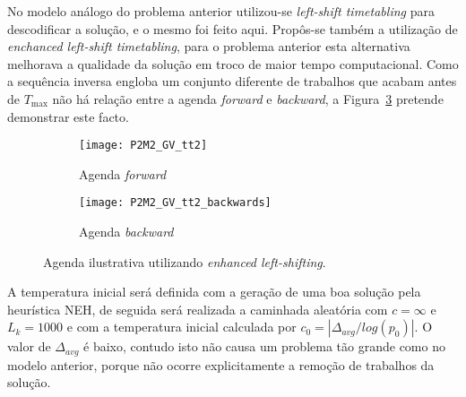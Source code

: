 No modelo análogo do problema anterior utilizou-se \textit{left-shift timetabling} para descodificar a solução, e o mesmo foi feito aqui. Propôs-se também a utilização de \textit{enchanced left-shift timetabling}, para o problema anterior esta alternativa melhorava a qualidade da solução em troco de maior tempo computacional. Como a sequência inversa engloba um conjunto diferente de trabalhos que acabam antes de $T_{\max}$ não há relação entre a agenda \textit{forward} e \textit{backward}, a Figura~\ref{fig:P2M2_GV_tt_for_back} pretende demonstrar este facto.\\
\begin{figure}[H]
	\centering
	\begin{subfigure}{0.49\textwidth}
	\centering
		\texttt{[image: P2M2\_GV\_tt2]}
		\caption{Agenda \textit{forward}}
		\label{fig:P2M2_GV_tt2}
	\end{subfigure}
	\begin{subfigure}{0.49\textwidth}
	\centering
		\texttt{[image: P2M2\_GV\_tt2\_backwards]}
		\caption{Agenda \textit{backward}}
		\label{fig:P2M2_GV_tt2_backwards}
	\end{subfigure}
	\caption{Agenda ilustrativa utilizando \textit{enhanced left-shifting}.}
	\label{fig:P2M2_GV_tt_for_back}
\end{figure}

A temperatura inicial será definida com a geração de uma boa solução pela heurística NEH, de seguida será realizada a caminhada aleatória com $c=\infty$ e $L_{k}=1000$ e com a temperatura inicial calculada por $c_{0}=|\Delta_{avg}/log(p_{0})|$. O valor de $\Delta_{avg}$ é baixo, contudo isto não causa um problema tão grande como no modelo anterior, porque não ocorre explicitamente a remoção de trabalhos da solução.\\

